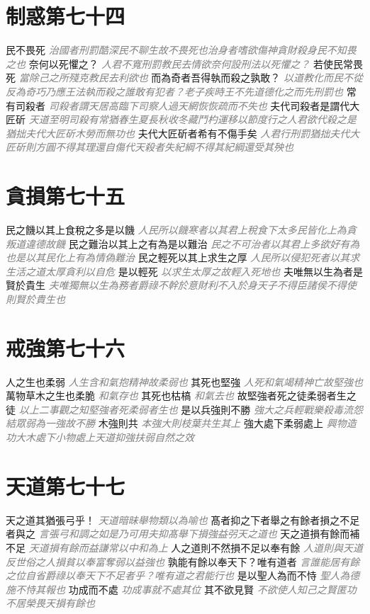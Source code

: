 \documentclass[a4paper,zihao=-4,oneside,landscape,UTF8]{ctexart}
\newcommand{\zhushi}[1]{\scriptsize{\textit{\textcolor{gray}{#1}}}\normalsize}
\begin{document}
\section{制惑第七十四}

民不畏死
\zhushi{治國者刑罰酷深民不聊生故不畏死也治身者嗜欲傷神貪財殺身民不知畏之也}
奈何以死懼之？
\zhushi{人君不寬刑罰教民去情欲奈何設刑法以死懼之？}
若使民常畏死
\zhushi{當除己之所殘克教民去利欲也}
而為奇者吾得執而殺之孰敢？
\zhushi{以道教化而民不從反為奇巧乃應王法執而殺之誰敢有犯者？老子疾時王不先道德化之而先刑罰也}
常有司殺者
\zhushi{司殺者謂天居高臨下司察人過天網恢恢疏而不失也}
夫代司殺者是謂代大匠斫
\zhushi{天道至明司殺有常猶春生夏長秋收冬藏鬥杓運移以節度行之人君欲代殺之是猶拙夫代大匠斫木勞而無功也}
夫代大匠斫者希有不傷手矣
\zhushi{人君行刑罰猶拙夫代大匠斫則方圓不得其理還自傷代天殺者失紀綱不得其紀綱還受其殃也}


\section{貪損第七十五}

民之饑以其上食稅之多是以饑
\zhushi{人民所以饑寒者以其君上稅食下太多民皆化上為貪叛道違德故饑}
民之難治以其上之有為是以難治
\zhushi{民之不可治者以其君上多欲好有為也是以其民化上有為情偽難治}
民之輕死以其上求生之厚
\zhushi{人民所以侵犯死者以其求生活之道太厚貪利以自危}
是以輕死
\zhushi{以求生太厚之故輕入死地也}
夫唯無以生為者是賢於貴生
\zhushi{夫唯獨無以生為務者爵祿不幹於意財利不入於身天子不得臣諸侯不得使則賢於貴生也}


\section{戒強第七十六}

人之生也柔弱
\zhushi{人生含和氣抱精神故柔弱也}
其死也堅強
\zhushi{人死和氣竭精神亡故堅強也}
萬物草木之生也柔脆
\zhushi{和氣存也}
其死也枯槁
\zhushi{和氣去也}
故堅強者死之徒柔弱者生之徒
\zhushi{以上二事觀之知堅強者死柔弱者生也}
是以兵強則不勝
\zhushi{強大之兵輕戰樂殺毒流怨結眾弱為一強故不勝}
木強則共
\zhushi{本強大則枝葉共生其上}
強大處下柔弱處上
\zhushi{興物造功大木處下小物處上天道抑強扶弱自然之效}


\section{天道第七十七}

天之道其猶張弓乎！
\zhushi{天道暗昧舉物類以為喻也}
髙者抑之下者舉之有餘者損之不足者與之
\zhushi{言張弓和調之如是乃可用夫抑髙舉下損強益弜天之道也}
天之道損有餘而補不足
\zhushi{天道損有餘而益謙常以中和為上}
人之道則不然損不足以奉有餘
\zhushi{人道則與天道反世俗之人損貧以奉富奪弱以益強也}
孰能有餘以奉天下？唯有道者
\zhushi{言誰能居有餘之位自省爵祿以奉天下不足者乎？唯有道之君能行也}
是以聖人為而不恃
\zhushi{聖人為德施不恃其報也}
功成而不處
\zhushi{功成事就不處其位}
其不欲見賢
\zhushi{不欲使人知己之賢匿功不居榮畏天損有餘也}
\end{document}

